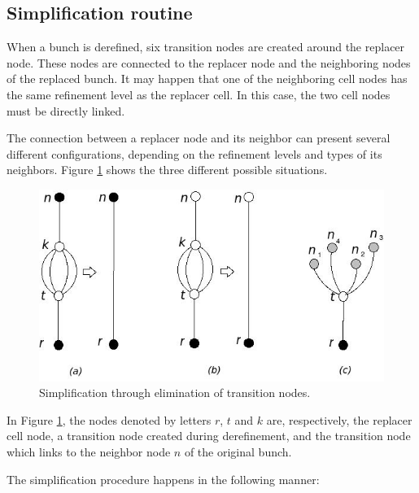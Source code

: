 \subsection{Simplification routine} \label{SUBSEC_SIMPLIFICACAO_DESREF}
When a bunch is derefined, six transition nodes are created around
the replacer node. These nodes are connected to the replacer node
and the neighboring nodes of the replaced bunch. It may happen that
one of the neighboring cell nodes has the same refinement level as
the replacer cell. In this case, the two cell nodes must be directly
linked.

The connection between a replacer node and its neighbor can present
several different configurations, depending on the refinement levels
and types of its neighbors. Figure
\ref{FIG_SIMPLIFICATION_DEREFINEMENT} shows the three different
possible situations.

\vspace{1cm}
\begin{figure}[H]
    \centering
    \includegraphics[scale=0.45]{../img/simplification_derefinement.jpg}
    \caption{Simplification through elimination of transition nodes.}
    \label{FIG_SIMPLIFICATION_DEREFINEMENT}
\end{figure}
\vspace{1cm}

In Figure \ref{FIG_SIMPLIFICATION_DEREFINEMENT}, the nodes denoted
by letters $r$, $t$ and $k$ are, respectively, the replacer cell
node, a transition node created during derefinement, and the
transition node which links to the neighbor node $n$ of the original
bunch.

The simplification procedure happens in the following manner:

